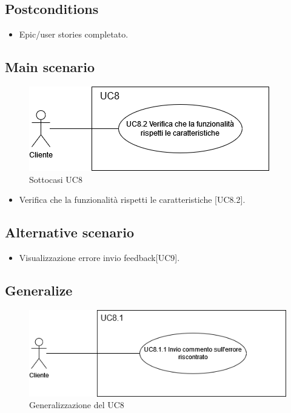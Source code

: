 \documentclass{article}
\begin{document}
    \subsection*{Postconditions}
    \begin{itemize}
        \item Epic/user stories completato.
    \end{itemize}
    
    \subsection*{Main scenario}
        \begin{figure}[h]
            \centering
            \includegraphics[width=.8\textwidth, height=.6\textheight, keepaspectratio]{documenti/imgUML/UC8-zoom.drawio.png}
            \caption{Sottocasi UC8}
            \label{fig:UC8_sottocasi}
        \end{figure}
        \begin{itemize}
            \item Verifica che la funzionalità rispetti le caratteristiche [UC8.2].
        \end{itemize}
        
    \subsection*{Alternative scenario}
    \begin{itemize}
        \item Visualizzazione errore invio feedback[UC9].
    \end{itemize}

    \subsection*{Generalize}
    \begin{figure}[h]
            \centering
            \includegraphics[width=.8\textwidth, height=.6\textheight, keepaspectratio]{documenti/imgUML/UC8.1-FEEDBACK-NEGATIVO.drawio.png}
            \caption{Generalizzazione del UC8}
            \label{fig:UC8_generalizzazione}
        \end{figure}
\end{document}
